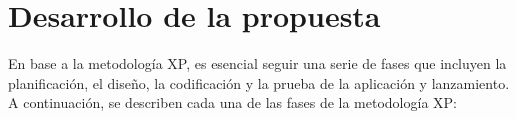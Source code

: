 \section{Desarrollo de la propuesta}



% 
% 
% 
% 


En base a la metodología XP, es esencial seguir una serie de fases que incluyen la planificación, el diseño, la
codificación y la prueba de la aplicación y lanzamiento. A continuación, se describen cada una de las fases de la
metodología XP:

